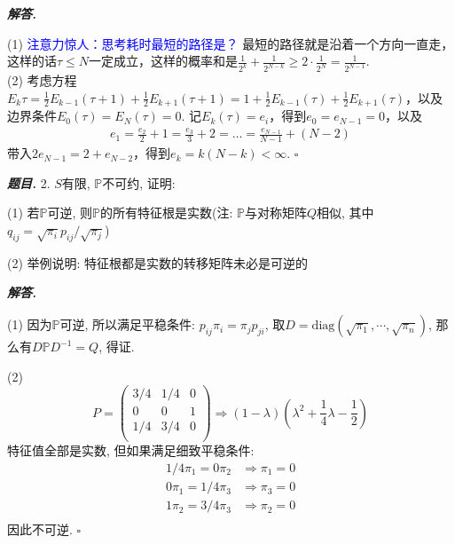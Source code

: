 \documentclass[10pt, a4paper, oneside]{ctexart}
\newenvironment{problem}{\begin{framed}\par\noindent\textbf{\textit{题目. }}}{\end{framed}\par}
\newenvironment{solution}{%
  \par\noindent\textbf{\textit{解答. }}\ignorespaces
}{%
  \hfill\ensuremath{\square}\par %
}
\begin{document}
    \begin{solution}
        (1) \textcolor{blue}{注意力惊人：思考耗时最短的路径是？} 最短的路径就是沿着一个方向一直走，这样的话$\tau\leq N$一定成立，这样的概率和是$\frac{1}{2^k}+\frac{1}{2^{N-k}}\geq 2\cdot\frac{1}{2^N}=\frac{1}{2^{N-1}}$.\\ 
        (2) 考虑方程$E_k\tau=\frac{1}{2}E_{k-1}(\tau+1)+\frac{1}{2}E_{k+1}(\tau+1)=1+\frac{1}{2}E_{k-1}(\tau)+\frac{1}{2}E_{k+1}(\tau)$，以及边界条件$E_0(\tau)=E_{N}(\tau)=0$. 记$E_k(\tau)=e_i$，得到$e_0=e_{N-1}=0$，以及
        \begin{align*}
            e_1=\frac{e_2}{2}+1=\frac{e_3}{3}+2=\dots=\frac{e_{N-1}}{N-1}+(N-2)
        \end{align*}
        带入$2e_{N-1}=2+e_{N-2}$，得到$e_k=k(N-k)<\infty$.
    \end{solution}

    \begin{problem}
        2. $S$有限, $\mathbb{P}$不可约, 证明:
    
        (1) 若$\mathbb{P}$可逆, 则$\mathbb{P}$的所有特征根是实数(注: $\mathbb{P}$与对称矩阵$Q$相似, 其中$q_{ij}=\sqrt{\pi_i}p_{ij}/\sqrt{\pi_j}$)
    
        (2) 举例说明: 特征根都是实数的转移矩阵未必是可逆的
    \end{problem}
    \begin{solution}
    (1) 因为$\mathbb{P}$可逆, 所以满足平稳条件: $p_{ij}\pi_i=\pi_jp_{ji}$, 取$D=\text{diag}(\sqrt{\pi_1},\cdots,\sqrt{\pi_n})$, 那么有$D\mathbb{P}D^{-1}=Q$, 得证.
    
    (2) 
    $$P=\begin{pmatrix}
        3/4&1/4&0\\
        0&0&1\\
        1/4&3/4&0\\
    \end{pmatrix}\Rightarrow (1-\lambda)(\lambda^2+\frac{1}{4}\lambda -\frac{1}{2})$$
    特征值全部是实数, 但如果满足细致平稳条件:
    \begin{align*}
        1/4\pi_1=0\pi_2&\Rightarrow \pi_1=0\\
        0\pi_1=1/4\pi_3&\Rightarrow \pi_3=0\\
        1\pi_2=3/4\pi_3&\Rightarrow \pi_2=0\\
    \end{align*}
    因此不可逆.
    \end{solution}
\end{document}
